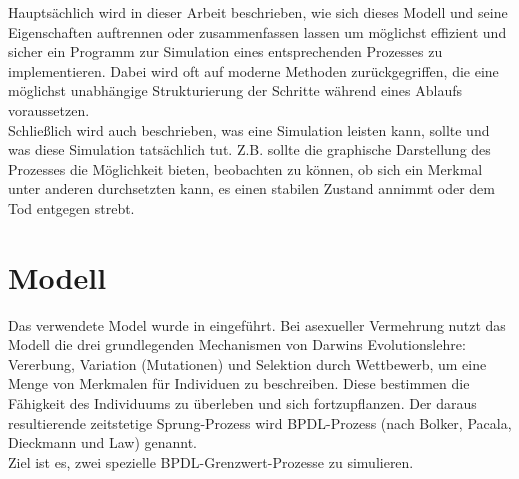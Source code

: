 \documentclass[11pt, a4paper, german]{article}
\theoremstyle{plain}
\begin{document}
Hauptsächlich wird in dieser Arbeit beschrieben, wie sich dieses Modell und seine Eigenschaften auftrennen oder zusammenfassen lassen um möglichst effizient und sicher ein Programm zur Simulation eines entsprechenden Prozesses zu implementieren. Dabei wird oft auf moderne Methoden zurückgegriffen, die eine möglichst unabhängige Strukturierung der Schritte während eines Ablaufs voraussetzen.\\
Schließlich wird auch beschrieben, was eine Simulation leisten kann, sollte und was diese Simulation tatsächlich tut. Z.B. sollte die graphische Darstellung des Prozesses die Möglichkeit bieten, beobachten zu können, ob sich ein Merkmal unter anderen durchsetzten kann, es einen stabilen Zustand annimmt oder dem Tod entgegen strebt.


\clearpage
\section{Modell}
Das verwendete Model wurde in \cite{Bolker_Spatial_moment,Bolker1997179,raey_Dieckmann_Law} eingeführt. Bei asexueller Vermehrung nutzt das Modell die drei grundlegenden Mechanismen von Darwins Evolutionslehre: Vererbung, Variation (Mutationen) und Selektion durch Wettbewerb, um eine Menge von Merkmalen für Individuen zu beschreiben. Diese bestimmen die Fähigkeit des Individuums zu überleben und sich fortzupflanzen. Der daraus resultierende zeitstetige Sprung-Prozess wird BPDL-Prozess (nach Bolker, Pacala, Dieckmann und Law) genannt.\\
Ziel ist es, zwei spezielle BPDL-Grenzwert-Prozesse zu simulieren.
\end{document}
